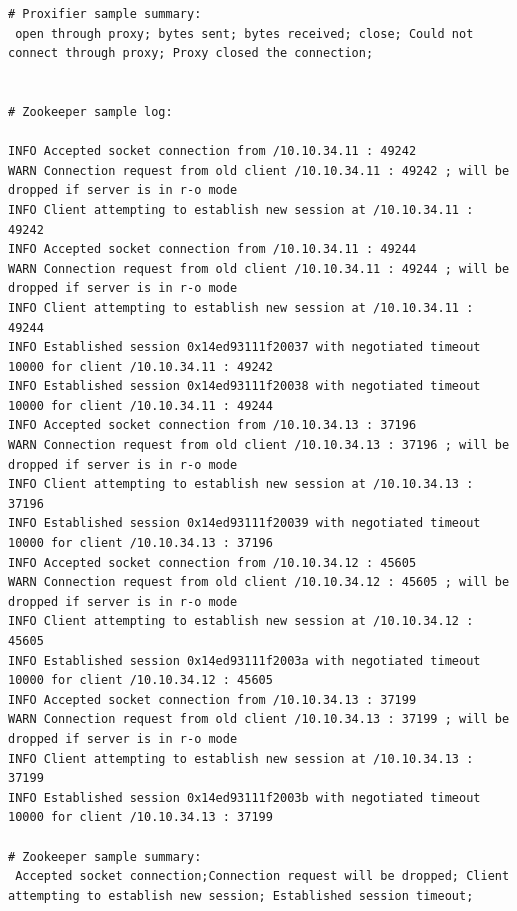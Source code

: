 \documentclass[conference]{IEEEtran}
\begin{document}
\begin{enumerate}
\begin{lstlisting}[numbers=none]
# Proxifier sample summary:
 open through proxy; bytes sent; bytes received; close; Could not connect through proxy; Proxy closed the connection;


# Zookeeper sample log:

INFO Accepted socket connection from /10.10.34.11 : 49242
WARN Connection request from old client /10.10.34.11 : 49242 ; will be dropped if server is in r-o mode
INFO Client attempting to establish new session at /10.10.34.11 : 49242
INFO Accepted socket connection from /10.10.34.11 : 49244
WARN Connection request from old client /10.10.34.11 : 49244 ; will be dropped if server is in r-o mode
INFO Client attempting to establish new session at /10.10.34.11 : 49244
INFO Established session 0x14ed93111f20037 with negotiated timeout 10000 for client /10.10.34.11 : 49242
INFO Established session 0x14ed93111f20038 with negotiated timeout 10000 for client /10.10.34.11 : 49244
INFO Accepted socket connection from /10.10.34.13 : 37196
WARN Connection request from old client /10.10.34.13 : 37196 ; will be dropped if server is in r-o mode
INFO Client attempting to establish new session at /10.10.34.13 : 37196
INFO Established session 0x14ed93111f20039 with negotiated timeout 10000 for client /10.10.34.13 : 37196
INFO Accepted socket connection from /10.10.34.12 : 45605
WARN Connection request from old client /10.10.34.12 : 45605 ; will be dropped if server is in r-o mode
INFO Client attempting to establish new session at /10.10.34.12 : 45605
INFO Established session 0x14ed93111f2003a with negotiated timeout 10000 for client /10.10.34.12 : 45605
INFO Accepted socket connection from /10.10.34.13 : 37199
WARN Connection request from old client /10.10.34.13 : 37199 ; will be dropped if server is in r-o mode
INFO Client attempting to establish new session at /10.10.34.13 : 37199
INFO Established session 0x14ed93111f2003b with negotiated timeout 10000 for client /10.10.34.13 : 37199

# Zookeeper sample summary:
 Accepted socket connection;Connection request will be dropped; Client attempting to establish new session; Established session timeout;
 
\end{lstlisting}


\end{enumerate}
\end{document}
